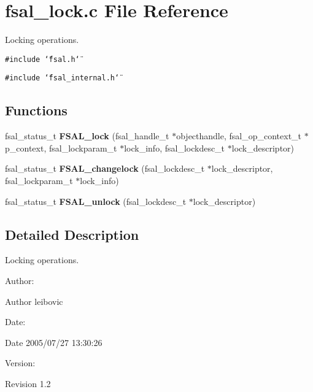 \section{fsal\_\-lock.c File Reference}
\label{fsal__lock_8c}
Locking operations. 

{\tt \#include \char`\"{}fsal.h\char`\"{}}\par
{\tt \#include \char`\"{}fsal\_\-internal.h\char`\"{}}\par
\subsection*{Functions}
\begin{CompactItemize}
\item 
fsal\_\-status\_\-t {\bf FSAL\_\-lock} (fsal\_\-handle\_\-t $\ast$objecthandle, fsal\_\-op\_\-context\_\-t $\ast$p\_\-context, fsal\_\-lockparam\_\-t $\ast$lock\_\-info, fsal\_\-lockdesc\_\-t $\ast$lock\_\-descriptor)
\item 
fsal\_\-status\_\-t {\bf FSAL\_\-changelock} (fsal\_\-lockdesc\_\-t $\ast$lock\_\-descriptor, fsal\_\-lockparam\_\-t $\ast$lock\_\-info)
\item 
fsal\_\-status\_\-t {\bf FSAL\_\-unlock} (fsal\_\-lockdesc\_\-t $\ast$lock\_\-descriptor)
\end{CompactItemize}


\subsection{Detailed Description}
Locking operations. 

\begin{Desc}
\item[Author:]\begin{Desc}
\item[Author]leibovic \end{Desc}
\end{Desc}
\begin{Desc}
\item[Date:]\begin{Desc}
\item[Date]2005/07/27 13:30:26 \end{Desc}
\end{Desc}
\begin{Desc}
\item[Version:]\begin{Desc}
\item[Revision]1.2 \end{Desc}
\end{Desc}


